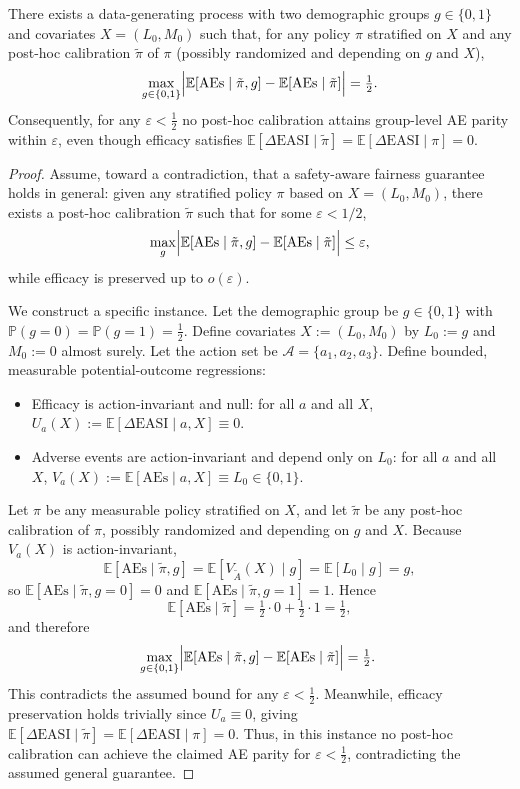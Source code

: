 ﻿\begin{theorem}\label{thm:posthoc-impossibility}
There exists a data-generating process with two demographic groups $g\in\{0,1\}$ and covariates $X=(L_0,M_0)$ such that, for any policy $\pi$ stratified on $X$ and any post-hoc calibration $\tilde \pi$ of $\pi$ (possibly randomized and depending on $g$ and $X$),
\[
\max_{g\in\{0,1\}}\Bigl\lvert\mathbb{E}[\mathrm{AEs}\mid \tilde\pi,g]-\mathbb{E}[\mathrm{AEs}\mid \tilde\pi]\Bigr\rvert=\tfrac12.
\]
Consequently, for any $\varepsilon<\tfrac12$ no post-hoc calibration attains group-level AE parity within $\varepsilon$, even though efficacy satisfies $\mathbb{E}[\Delta\mathrm{EASI}\mid \tilde\pi]=\mathbb{E}[\Delta\mathrm{EASI}\mid \pi]=0$.
\end{theorem}

\begin{proof}
Assume, toward a contradiction, that a safety-aware fairness guarantee holds in general: given any stratified policy $\pi$ based on $X=(L_0,M_0)$, there exists a post-hoc calibration $\tilde\pi$ such that for some $\varepsilon<1/2$,
\[
\max_{g}\Bigl\lvert\mathbb{E}[\mathrm{AEs}\mid \tilde\pi,g]-\mathbb{E}[\mathrm{AEs}\mid \tilde\pi]\Bigr\rvert\le \varepsilon,
\]
while efficacy is preserved up to $o(\varepsilon)$.

We construct a specific instance. Let the demographic group be $g\in\{0,1\}$ with $\mathbb{P}(g=0)=\mathbb{P}(g=1)=\tfrac12$. Define covariates $X:=(L_0,M_0)$ by $L_0:=g$ and $M_0:=0$ almost surely. Let the action set be $\mathcal{A}=\{a_1,a_2,a_3\}$. Define bounded, measurable potential-outcome regressions:
\begin{itemize}
  \item Efficacy is action-invariant and null: for all $a$ and all $X$, $U_a(X):=\mathbb{E}[\Delta\mathrm{EASI}\mid a,X]\equiv 0$.
  \item Adverse events are action-invariant and depend only on $L_0$: for all $a$ and all $X$, $V_a(X):=\mathbb{E}[\mathrm{AEs}\mid a,X]\equiv L_0\in\{0,1\}$.
\end{itemize}
Let $\pi$ be any measurable policy stratified on $X$, and let $\tilde\pi$ be any post-hoc calibration of $\pi$, possibly randomized and depending on $g$ and $X$. Because $V_a(X)$ is action-invariant,
\[
\mathbb{E}[\mathrm{AEs}\mid \tilde\pi,g]=\mathbb{E}[V_{\tilde A}(X)\mid g]=\mathbb{E}[L_0\mid g]=g,
\]
so $\mathbb{E}[\mathrm{AEs}\mid \tilde\pi,g{=}0]=0$ and $\mathbb{E}[\mathrm{AEs}\mid \tilde\pi,g{=}1]=1$. Hence
\[
\mathbb{E}[\mathrm{AEs}\mid \tilde\pi]=\tfrac12\cdot 0+\tfrac12\cdot 1=\tfrac12,
\]
and therefore
\[
\max_{g\in\{0,1\}}\Bigl\lvert\mathbb{E}[\mathrm{AEs}\mid \tilde\pi,g]-\mathbb{E}[\mathrm{AEs}\mid \tilde\pi]\Bigr\rvert=\tfrac12.\ \qedhere
\]
This contradicts the assumed bound for any $\varepsilon<\tfrac12$. Meanwhile, efficacy preservation holds trivially since $U_a\equiv 0$, giving $\mathbb{E}[\Delta\mathrm{EASI}\mid \tilde\pi]=\mathbb{E}[\Delta\mathrm{EASI}\mid \pi]=0$. Thus, in this instance no post-hoc calibration can achieve the claimed AE parity for $\varepsilon<\tfrac12$, contradicting the assumed general guarantee.
\end{proof}
